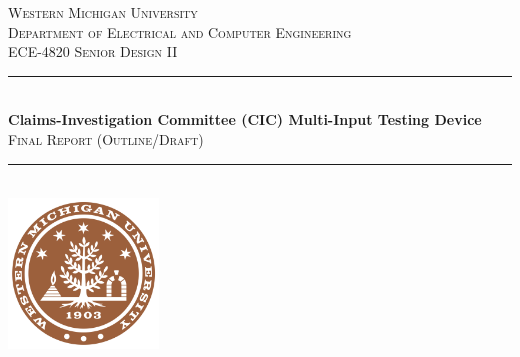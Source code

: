 \documentclass[12pt]{article}
\begin{document}
\begin{titlepage}
    \newcommand{\HRule}{\rule{\linewidth}{0.5mm}} %
    
    \center %
    
    
    \textsc{\LARGE Western Michigan University}\\[0.5cm]
    \textsc{\Large Department of Electrical and Computer Engineering}\\[0.5cm] 
    \textsc{\large ECE-4820 Senior Design II}\\[0.5cm] 
    
    
    \HRule \\[0.4cm]
    { \huge \bfseries  Claims-Investigation Committee (CIC) Multi-Input Testing Device}\\[0.4cm]  
    \textsc{\Large Final Report (Outline/Draft)}\\[0.4cm] 
    \HRule \\[1.5cm]
    
    
    \includegraphics[width=0.3\textwidth]{./../assets/WMU_Logo.png}\\[1cm]  
    

\end{titlepage}
\end{document}
